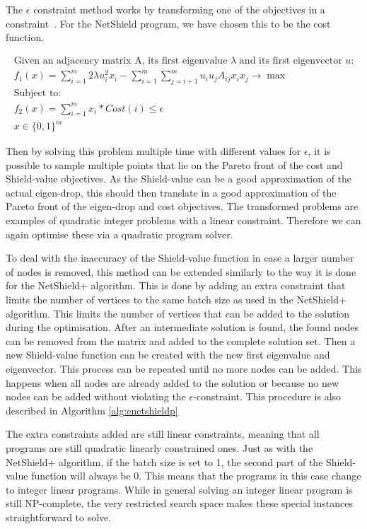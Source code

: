 \documentclass[11pt]{article}
\theoremstyle{definition}
\begin{document}
The $\epsilon$ constraint method works by transforming one of the objectives in a constraint~\cite{KaisaNMO}. For the NetShield program, we have chosen this to be the cost function. 

\begin{equation}
\begin{gathered}
\text{Given an adjacency matrix A, its first eigenvalue $\lambda$ and its first eigenvector $u$:}\\
f_{1}(x) = \sum_{i=1}^{m} 2 \lambda  u_{i}^{2} x_{i} - \sum_{i=1}^{m} \sum_{j=i+1}^{m} u_{i} u_{j} A_{ij} x_{i} x_{j} \to \max \\
\text{Subject to:}\\
f_{2}(x) = \sum_{i=1}^{m} x_{i} * Cost(i) \leq \epsilon\\
x \in \{0,1\}^{m}
\end{gathered}
\end{equation}

Then by solving this problem multiple time with different values for $\epsilon$, it is possible to sample multiple points that lie on the Pareto front of the cost and Shield-value objectives. As the Shield-value can be a good approximation of the actual eigen-drop, this should then translate in a good approximation of the Pareto front of the eigen-drop and cost objectives. The transformed problems are examples of quadratic integer problems with a linear constraint. Therefore we can again optimise these via a quadratic program solver.

To deal with the inaccuracy of the Shield-value function in case a larger number of nodes is removed, this method can be extended similarly to the way it is done for the NetShield+ algorithm. This is done by adding an extra constraint that limits the number of vertices to the same batch size as used in the NetShield+ algorithm. This limits the number of vertices that can be added to the solution during the optimisation. After an intermediate solution is found, the found nodes can be removed from the matrix and added to the complete solution set. Then a new Shield-value function can be created with the new first eigenvalue and eigenvector. This process can be repeated until no more nodes can be added. This happens when all nodes are already added to the solution or because no new nodes can be added without violating the $\epsilon$-constraint. This procedure is also described in Algorithm \ref{alg:enetshieldp}

The extra constraints added are still linear constraints, meaning that all programs are still quadratic linearly constrained ones. Just as with the NetShield+ algorithm, if the batch size is set to 1, the second part of the Shield-value function will always be 0. This means that the programs in this case change to integer linear programs. While in general solving an integer linear program is still NP-complete, the very restricted search space makes these special instances straightforward to solve.
\end{document}
